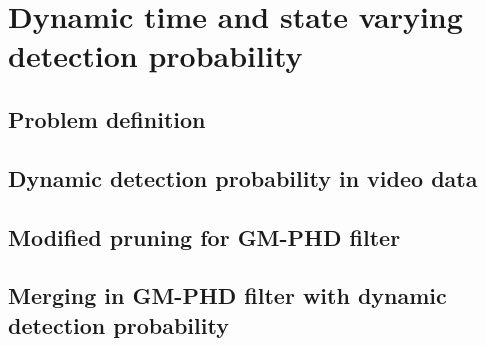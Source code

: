 \chapter{Dynamic time and state varying detection probability}

\section{Problem definition}

\section{Dynamic detection probability in video data}
\section{Modified pruning for GM-PHD filter}
\section{Merging in GM-PHD filter with dynamic detection probability}